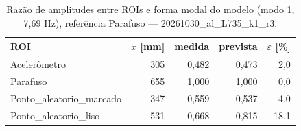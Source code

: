\begin{table}[htbp]
  \centering
  \caption{Razão de amplitudes entre ROIs e forma modal do modelo (modo 1, 7{,}69 Hz), referência Parafuso — 20261030\_al\_L735\_k1\_r3.}
  \label{tab:forma_modal_20261030_al_L735_k1_r3}
  \begin{tabular}{lrrrr}
    \toprule
    ROI & $x$ [mm] & medida & prevista & $\varepsilon$ [\%] \\
    \midrule
    Acelerômetro & 305 & 0{,}482 & 0{,}473 & 2{,}0 \\
    Parafuso & 655 & 1{,}000 & 1{,}000 & 0{,}0 \\
    Ponto\_aleatorio\_marcado & 347 & 0{,}559 & 0{,}537 & 4{,}0 \\
    Ponto\_aleatorio\_liso & 531 & 0{,}668 & 0{,}815 & -18{,}1 \\
    \bottomrule
  \end{tabular}
\end{table}

